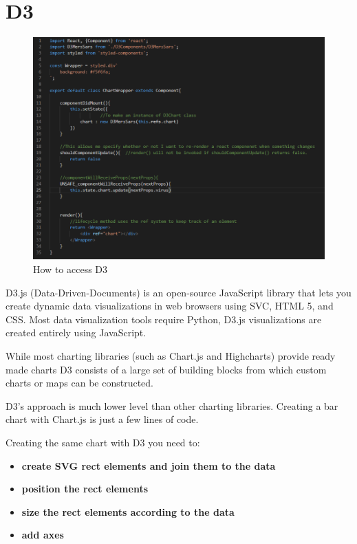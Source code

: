 \section{D3}

\begin{figure}
    \centering
    \includegraphics[scale=0.6]{img/D3Ref.PNG}
    \caption{How to access D3}
    \label{fig:my_label4}
\end{figure}

D3.js (Data-Driven-Documents) is an open-source JavaScript library that lets you create dynamic data visualizations in web browsers using SVC, HTML 5, and CSS.
Most data visualization tools require Python, D3.js visualizations are created entirely using JavaScript.

While most charting libraries (such as Chart.js and Highcharts) provide ready made charts D3 consists of a large set of building blocks from which custom charts or maps can be constructed.

D3’s approach is much lower level than other charting libraries. Creating a bar chart with Chart.js is just a few lines of code.

Creating the same chart with D3 you need to:

\begin{itemize}

\item \textbf{create SVG rect elements and join them to the data}
\item \textbf{position the rect elements}
\item \textbf{size the rect elements according to the data}
\item \textbf{add axes}

\end{itemize}


